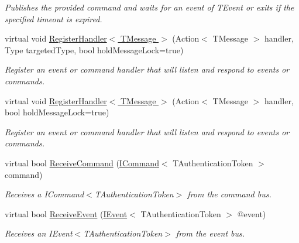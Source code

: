 \begin{DoxyCompactItemize}
\begin{DoxyCompactList}\small\item\em Publishes the provided {\itshape command}  and waits for an event of {\itshape T\+Event}  or exits if the specified timeout is expired. \end{DoxyCompactList}\item 
virtual void \hyperlink{classCqrs_1_1Bus_1_1InProcessBus_aa14a00defdf2d48b2d0e6a65dbdb12d9}{Register\+Handler$<$ T\+Message $>$} (Action$<$ T\+Message $>$ handler, Type targeted\+Type, bool hold\+Message\+Lock=true)
\begin{DoxyCompactList}\small\item\em Register an event or command handler that will listen and respond to events or commands. \end{DoxyCompactList}\item 
virtual void \hyperlink{classCqrs_1_1Bus_1_1InProcessBus_a62171e3c6d155cfdfd921b07b4909adf}{Register\+Handler$<$ T\+Message $>$} (Action$<$ T\+Message $>$ handler, bool hold\+Message\+Lock=true)
\begin{DoxyCompactList}\small\item\em Register an event or command handler that will listen and respond to events or commands. \end{DoxyCompactList}\item 
virtual bool \hyperlink{classCqrs_1_1Bus_1_1InProcessBus_afa5b4def79709baa28fbd15c215a4111}{Receive\+Command} (\hyperlink{interfaceCqrs_1_1Commands_1_1ICommand}{I\+Command}$<$ T\+Authentication\+Token $>$ command)
\begin{DoxyCompactList}\small\item\em Receives a I\+Command$<$\+T\+Authentication\+Token$>$ from the command bus. \end{DoxyCompactList}\item 
virtual bool \hyperlink{classCqrs_1_1Bus_1_1InProcessBus_aab52f8518371f5ff5e3f193b1234f192}{Receive\+Event} (\hyperlink{interfaceCqrs_1_1Events_1_1IEvent}{I\+Event}$<$ T\+Authentication\+Token $>$ @event)
\begin{DoxyCompactList}\small\item\em Receives an I\+Event$<$\+T\+Authentication\+Token$>$ from the event bus. \end{DoxyCompactList}\end{DoxyCompactItemize}
